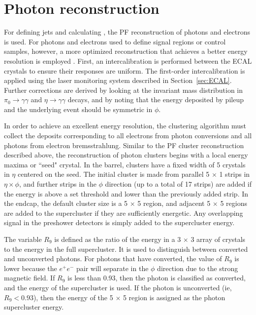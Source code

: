 \section{Photon reconstruction}
\label{sec:phoReco}
For defining jets and calculating \ETmiss, the PF reconstruction of photons and electrons is used. 
For photons and electrons used to define signal regions or control samples, however, a more optimized reconstruction that achieves a better energy resolution is employed \cite{phoPerf8TeV,elePerf8TeV}. First, an intercalibration is performed between the ECAL crystals to ensure their responses are uniform. The first-order intercalibration is applied using the laser monitoring system described in Section~\ref{sec:ECAL}. Further corrections are derived by looking at the invariant mass distribution in $\pi_0 \rightarrow \gamma\gamma$ and $\eta \rightarrow \gamma\gamma$ decays, and by noting that the energy deposited by pileup and the underlying event should be symmetric in $\phi$.

In order to achieve an excellent energy resolution, the clustering algorithm must collect the deposits corresponding to all electrons from photon conversions and all photons from electron bremsstrahlung. Similar to the PF cluster reconstruction described above, the reconstruction of photon clusters begins with a local energy maxima or ``seed" crystal. In the barrel, clusters have a fixed width of 5 crystals in $\eta$ centered on the seed. The initial cluster is made from parallel 5 $\times$ 1 strips in $\eta \times \phi$, and further strips in the $\phi$ direction (up to a total of 17 strips) are added if the energy is above a set threshold and lower than the previously added strip. In the endcap, the default cluster size is a 5 $\times$ 5 region, and adjacent 5 $\times$ 5 regions are added to the supercluster if they are sufficiently energetic. Any overlapping signal in the preshower detectors is simply added to the supercluster energy.

The variable $R_9$ is defined as the ratio of the energy in a 3 $\times$ 3 array of crystals to the energy in the full supercluster. It is used to distinguish between converted and unconverted photons. For photons that have converted, the value of $R_9$ is lower because the $e^+e^-$ pair will separate in the $\phi$ direction due to the strong magnetic field. If $R_9$ is less than 0.93, then the photon is classified as converted, and the energy of the supercluster is used. If the photon is unconverted (ie, $R_9 < 0.93$), then the energy of the 5 $\times$ 5 region is assigned as the photon supercluster energy.

